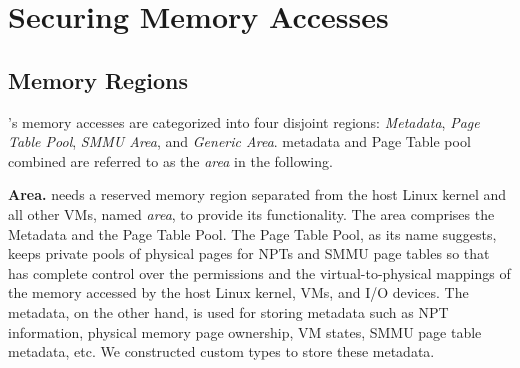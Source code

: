 \chapter{Securing \rustcore{} Memory Accesses}
\label{sec:securercore}

%

\section{\rustcore{} Memory Regions}
\label{sec:rcoreregions}

\rustcore{}'s memory accesses are categorized into four disjoint regions:
\textit{\rustcore{} Metadata}, \textit{Page Table Pool},
\textit{SMMU Area}, and \textit{Generic Area}.
\rustcore{} metadata and \rustcore{} Page Table pool combined are referred to as
the \textit{\rustcore{} area} in the following.

\textbf{\rustcore{} Area.}
\rustcore{} needs a reserved memory region separated from the host Linux kernel
and all other VMs, named \textit{\rustcore{} area}, to provide its functionality.
The \rustcore{} area comprises the \rustcore{} Metadata and the \rustcore{} Page Table Pool.
The \rustcore{} Page Table Pool, as its name suggests, keeps private pools of physical pages
for NPTs and SMMU page tables so that \rustcore{} has complete control
over the permissions and the virtual-to-physical mappings of the memory
accessed by the host Linux kernel, VMs, and I/O devices. The \rustcore{} metadata,
on the other hand, is used for storing \rustcore{} metadata such as NPT information,
physical memory page ownership, VM states, SMMU page table metadata, etc.
We constructed custom types to store these \rustcore{} metadata.

